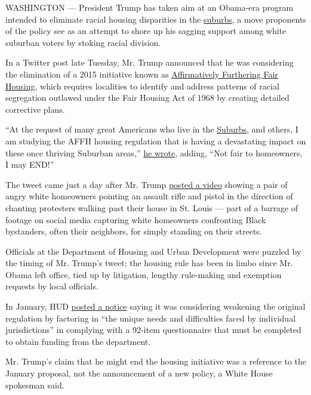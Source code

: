 WASHINGTON --- President Trump has taken aim at an Obama-era program
intended to eliminate racial housing disparities in the
\href{https://www.nytimes.com/2020/07/10/us/politics/trump-white-voters-in-suburbs.html}{suburbs},
a move proponents of the policy see as an attempt to shore up his
sagging support among white suburban voters by stoking racial division.

In a Twitter post late Tuesday, Mr. Trump announced that he was
considering the elimination of a 2015 initiative known as
\href{https://www.hudexchange.info/programs/affh/}{Affirmatively
Furthering Fair Housing}, which requires localities to identify and
address patterns of racial segregation outlawed under the Fair Housing
Act of 1968 by creating detailed corrective plans.

``At the request of many great Americans who live in the
\href{https://www.nytimes.com/2020/07/10/us/politics/trump-white-voters-in-suburbs.html}{Suburbs},
and others, I am studying the AFFH housing regulation that is having a
devastating impact on these once thriving Suburban areas,''
\href{https://twitter.com/realDonaldTrump/status/1278136326647406593}{he
wrote}, adding, ``Not fair to homeowners, I may END!''

The tweet came just a day after Mr. Trump
\href{https://www.nytimes.com/2020/06/29/us/politics/trump-white-couple-protesters.html}{posted
a video} showing a pair of angry white homeowners pointing an assault
rifle and pistol in the direction of chanting protesters walking past
their house in St. Louis --- part of a barrage of footage on social
media capturing white homeowners confronting Black bystanders, often
their neighbors, for simply standing on their streets.

Officials at the Department of Housing and Urban Development were
puzzled by the timing of Mr. Trump's tweet; the housing rule has been in
limbo since Mr. Obama left office, tied up by litigation, lengthy
rule-making and exemption requests by local officials.

In January, HUD
\href{https://www.federalregister.gov/documents/2020/01/14/2020-00234/affirmatively-furthering-fair-housing}{posted
a notice} saying it was considering weakening the original regulation by
factoring in ``the unique needs and difficulties faced by individual
jurisdictions'' in complying with a 92-item questionnaire that must be
completed to obtain funding from the department.

Mr. Trump's claim that he might end the housing initiative was a
reference to the January proposal, not the announcement of a new policy,
a White House spokesman said.

